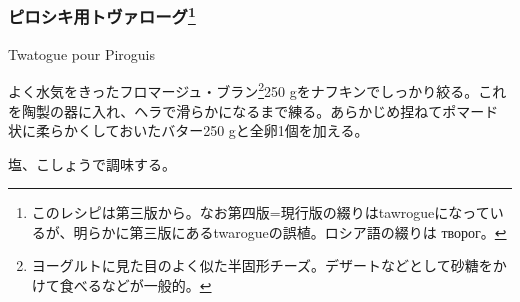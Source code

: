 \begin{recette}
\atoaki{}

\hypertarget{ux30d4ux30edux30b7ux30adux7528ux30c8ux30f4ux30a1ux30edux30fcux30b072}{%
\subsubsection[ピロシキ用トヴァローグ]{\texorpdfstring{ピロシキ用トヴァローグ\footnote{このレシピは第三版から。なお第四版=現行版の綴りはtawrogueになっているが、明らかに第三版にあるtwarogueの誤植。ロシア語の綴りは
  творог。}}{ピロシキ用トヴァローグ}}\label{ux30d4ux30edux30b7ux30adux7528ux30c8ux30f4ux30a1ux30edux30fcux30b072}}

\begin{frsubenv}

Twatogue pour Piroguis

\end{frsubenv}


よく水気をきったフロマージュ・ブラン\footnote{ヨーグルトに見た目のよく似た半固形チーズ。デザートなどとして砂糖をかけて食べるなどが一般的。}250
gをナフキンでしっかり絞る。これを陶製の器に入れ、ヘラで滑らかになるまで練る。あらかじめ捏ねてポマード状に柔らかくしておいたバター250
gと全卵1個を加える。

塩、こしょうで調味する。

\end{recette}
